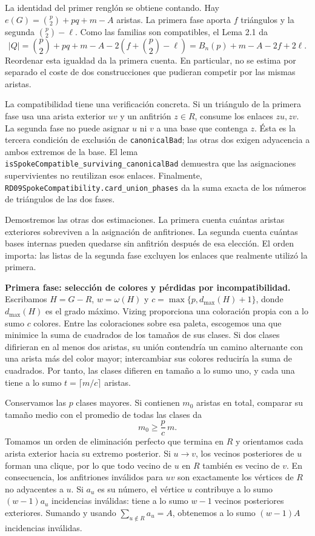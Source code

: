 \documentclass[spanish,11pt,a4paper]{article}
\begin{document}
La identidad del primer renglón se obtiene contando. Hay \(e(G)=\binom p2+pq+m-A\) aristas. La primera fase aporta \(f\) triángulos y la segunda \(\binom p2-\ell\). Como las familias son compatibles, el Lema 2.1 da \[
|Q|=\binom p2+pq+m-A-2\left(f+\binom p2-\ell\right)
=B_n(p)+m-A-2f+2\ell.
\tag{5.4a}
\] Reordenar esta igualdad da la primera cuenta. En particular, no se estima por separado el coste de dos construcciones que pudieran competir por las mismas aristas.

La compatibilidad tiene una verificación concreta. Si un triángulo de la primera fase usa una arista exterior \(uv\) y un anfitrión \(z\in R\), consume los enlaces \(zu,zv\). La segunda fase no puede asignar \(u\) ni \(v\) a una base que contenga \(z\). Ésta es la tercera condición de exclusión de \nolinkurl{canonicalBad}; las otras dos exigen adyacencia a ambos extremos de la base. El lema \nolinkurl{isSpokeCompatible_surviving_canonicalBad} demuestra que las asignaciones supervivientes no reutilizan esos enlaces. Finalmente, \nolinkurl{RD09SpokeCompatibility.card_union_phases} da la suma exacta de los números de triángulos de las dos fases.

Demostremos las otras dos estimaciones. La primera cuenta cuántas aristas exteriores sobreviven a la asignación de anfitriones. La segunda cuenta cuántas bases internas pueden quedarse sin anfitrión después de esa elección. El orden importa: las listas de la segunda fase excluyen los enlaces que realmente utilizó la primera.

\textbf{Primera fase: selección de colores y pérdidas por incompatibilidad.} Escribamos \(H=G-R\), \(w=\omega(H)\) y \(c=\max\{p,d_{\max}(H)+1\}\), donde \(d_{\max}(H)\) es el grado máximo. Vizing proporciona una coloración propia con a lo sumo \(c\) colores. Entre las coloraciones sobre esa paleta, escogemos una que minimice la suma de cuadrados de los tamaños de sus clases. Si dos clases difirieran en al menos dos aristas, su unión contendría un camino alternante con una arista más del color mayor; intercambiar sus colores reduciría la suma de cuadrados. Por tanto, las clases difieren en tamaño a lo sumo uno, y cada una tiene a lo sumo \(t=\lceil m/c\rceil\) aristas.

Conservamos las \(p\) clases mayores. Si contienen \(m_0\) aristas en total, comparar su tamaño medio con el promedio de todas las clases da \[
m_0\ge\frac pc\,m.
\tag{5.5}
\] Tomamos un orden de eliminación perfecto que termina en \(R\) y orientamos cada arista exterior hacia su extremo posterior. Si \(u\to v\), los vecinos posteriores de \(u\) forman una clique, por lo que todo vecino de \(u\) en \(R\) también es vecino de \(v\). En consecuencia, los anfitriones inválidos para \(uv\) son exactamente los vértices de \(R\) no adyacentes a \(u\). Si \(a_u\) es su número, el vértice \(u\) contribuye a lo sumo \((w-1)a_u\) incidencias inválidas: tiene a lo sumo \(w-1\) vecinos posteriores exteriores. Sumando y usando \(\sum_{u\notin R}a_u=A\), obtenemos a lo sumo \((w-1)A\) incidencias inválidas.
\end{document}
